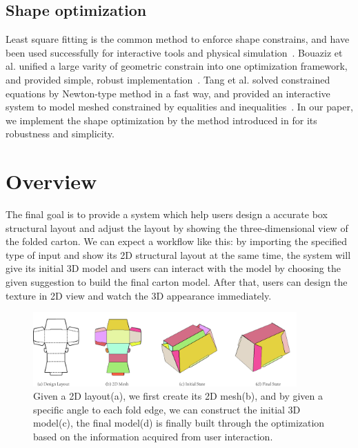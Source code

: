 \documentclass[submission]{gmp2018}
\begin{document}
\subsection{Shape optimization}
Least square fitting is the common method to enforce shape constrains, and have been used successfully for interactive tools and physical simulation~\cite{Botsch:2006:PCP:1281957.1281959,Igarashi:2005:ASM:1186822.1073323}. Bouaziz et al.  unified a large varity of geometric constrain into one optimization framework, and provided simple, robust implementation~\cite{Bouaziz:2012:SSD:2346796.2346802}. Tang et al. solved constrained equations by Newton-type method in a fast way, and provided an interactive system to model meshed constrained by equalities and inequalities~\cite{Tang:2014:FPM:2601097.2601213}. In our paper, we implement the shape optimization by the method introduced in \cite{Bouaziz:2012:SSD:2346796.2346802} for its robustness and simplicity.


\section{Overview}\label{sec:overview}
The final goal is to provide a system which help users design a accurate box structural layout and adjust the layout by showing the three-dimensional view of the folded carton. We can expect a workflow like this: by importing the specified type of input and show its 2D structural layout at the same time, the system will give its initial 3D model and users can interact with the model by choosing the given suggestion to build the final carton model. After that, users can design the texture in 2D view and watch the 3D appearance immediately.

\begin{figure}
	\centering
	\includegraphics[width=0.9\textwidth]{images/overview.jpg}
	\caption{Given a 2D layout(a), we first create its 2D mesh(b), and by given a specific angle to each fold edge, we can construct the initial 3D model(c), the final model(d) is finally built through the optimization based on the information acquired from user interaction.}
	\label{fig:overview}
\end{figure} 
\end{document}
